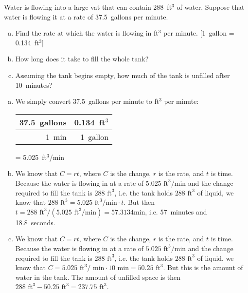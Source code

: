\documentclass[11pt,letterpaper]{article}
\begin{document}

 Water is flowing into a large vat that can contain 288~ft$^3$ of water. Suppose that water is flowing it at a rate of 37.5~gallons per minute. 
	\begin{enumerate}[(a)]
	\item Find the rate at which the water is flowing in ft$^3$ per minute. [1~gallon = 0.134~ft$^3$]
	\item How long does it take to fill the whole tank?
	\item Assuming the tank begins empty, how much of the tank is unfilled after 10~minutes?
	\end{enumerate} \pspace

\sol
\begin{enumerate}[(a)]
\item We simply convert 37.5~gallons per minute to ft$^3$ per minute: \par
	\begin{table}[!ht]
	\centering
	\begin{tabular}{r|r}
	37.5~gallons & 0.134~ft$^3$ \\ \hline
	1~min	     & 1~gallon
	\end{tabular}
	= 5.025~ft$^3$/min
	\end{table} \pspace
 
\item We know that $C= rt$, where $C$ is the change, $r$ is the rate, and $t$ is time. Because the water is flowing in at a rate of $5.025 \text{ ft}^3/\text{min}$ and the change required to fill the tank is $288 \text{ ft}^3$, i.e. the tank holds $288 \text{ ft}^3$ of liquid, we know that $288 \text{ ft}^3= 5.025 \text{ ft}^3/\text{min} \cdot t$. But then $t= 288 \text{ ft}^3/(5.025 \text{ ft}^3/\text{min})= 57.3134 \text{min}$, i.e. 57~minutes and 18.8~seconds. \pspace
 
\item We know that $C= rt$, where $C$ is the change, $r$ is the rate, and $t$ is time. Because the water is flowing in at a rate of $5.025 \text{ ft}^3/\text{min}$ and the change required to fill the tank is $288 \text{ ft}^3$, i.e. the tank holds $288 \text{ ft}^3$ of liquid, we know that $C= 5.025 \text{ ft}^3/\text{ min} \cdot 10 \text{ min}= 50.25 \text{ ft}^3$. But this is the amount of water in the tank. The amount of unfilled space is then $288 \text{ ft}^3 - 50.25 \text{ ft}^3= 237.75 \text{ ft}^3$. \pspace 
\end{enumerate}
\end{document}
